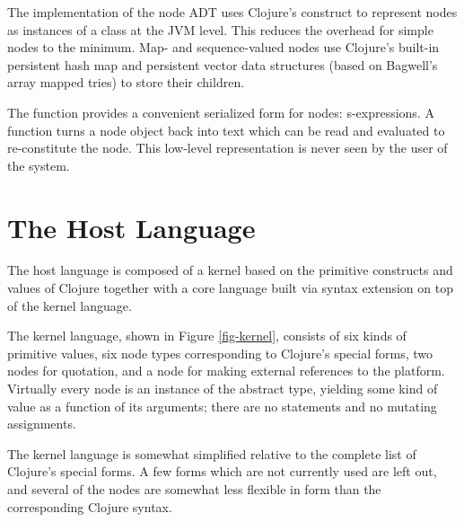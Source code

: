 The implementation of the node ADT uses Clojure's  construct to represent nodes as instances of a  class at the JVM level. This reduces the overhead for simple nodes to the minimum. Map- and sequence-valued nodes use Clojure's built-in persistent hash map and persistent vector data structures (based on Bagwell's array mapped tries\cite{bagwell}) to store their children.

The  function provides a convenient serialized form for nodes: s-expressions. A  function turns a node object back into text which can be read and evaluated to re-constitute the node. This low-level representation is never seen by the user of the system.


\section{The Host Language}
\label{host}
The host language is composed of a kernel based on the primitive constructs and values of Clojure together with a core language built via syntax extension on top of the kernel language.

The kernel language, shown in Figure \ref{fig-kernel}, consists of six kinds of primitive values, six node types corresponding to Clojure's special forms, two nodes for quotation, and a node for making external references to the platform. Virtually every node is an instance of the abstract  type, yielding some kind of value as a function of its arguments; there are no statements and no mutating assignments.

The kernel language is somewhat simplified relative to the complete list of Clojure's special forms. A few forms which are not currently used are left out, and several of the nodes are somewhat less flexible in form than the corresponding Clojure syntax.

